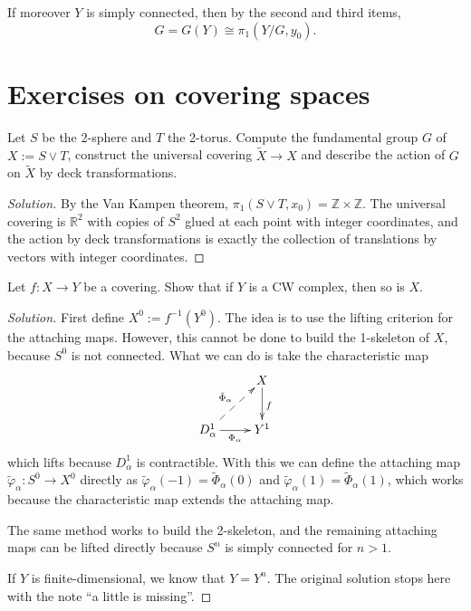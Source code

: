 \begin{corollary}
\label{corollary-covering-action-simply-conn}
If moreover $Y$ is simply connected, then by
the second and third items,
$$
G=G(Y)\cong\pi_1(Y/G,y_0).
$$
\end{corollary}

\section{Exercises on covering spaces}
\label{section-covering-exercises}

\begin{exercise}
\label{exercise-covering-sphere-wedge-torus}
Let $S$ be the 2-sphere and $T$ the 2-torus.
Compute the fundamental group $G$ of
$X:=S\vee T$, construct the universal
covering $\widetilde{X}\to X$ and describe
the action of $G$ on $\widetilde{X}$ by deck
transformations.
\end{exercise}

\begin{proof}[Solution]
By the Van Kampen theorem,
$\pi_1(S\vee T,x_0)
=\mathbb{Z}\times\mathbb{Z}$.
The universal covering is $\mathbb{R}^2$
with copies of $S^2$ glued at each point
with integer coordinates, and the action by
deck transformations is exactly the
collection of translations by vectors with
integer coordinates.
\end{proof}

\begin{exercise}
\label{exercise-covering-of-cw-complex}
Let $f:X\to Y$ be a covering. Show that if
$Y$ is a CW complex, then so is $X$.
\end{exercise}

\begin{proof}[Solution]
First define $X^0:=f^{-1}(Y^0)$. The idea is
to use the lifting criterion for the
attaching maps. However, this cannot be done
to build the 1-skeleton of $X$, because
$S^0$ is not connected. What we can do is
take the characteristic map
$$
\xymatrix{
  & X \ar[d]^{f} \\
D_\alpha^1
  \ar@{-->}[ur]^{\tilde{\Phi}_\alpha}
  \ar[r]_{\Phi_\alpha}
  & Y^1
}
$$
which lifts because $D^1_\alpha$ is
contractible. With this we can define the
attaching map
$\tilde{\varphi}_\alpha:S^0\to X^0$
directly as
$\tilde{\varphi}_\alpha(-1)
=\tilde{\Phi}_\alpha(0)$
and
$\tilde{\varphi}_\alpha(1)
=\tilde{\Phi}_\alpha(1)$,
which works because the characteristic map
extends the attaching map.

The same method works to build the
2-skeleton, and the remaining attaching maps
can be lifted directly because $S^n$ is
simply connected for $n>1$.

If $Y$ is finite-dimensional, we know that
$Y=Y^n$. The original solution stops here
with the note ``a little is missing''.
\end{proof}

